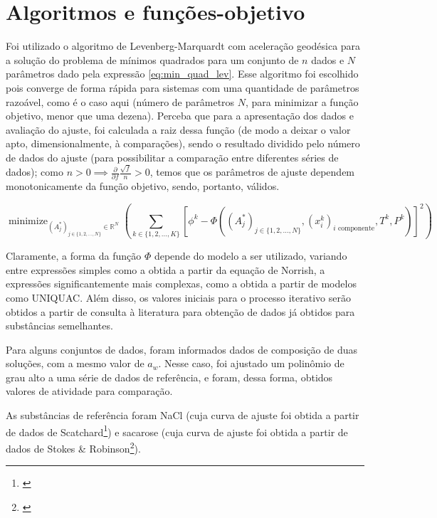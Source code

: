 \documentclass[
	12pt,				%
	openright,
	twoside,
	a4paper,			%
	english,			%
	french,				%
	brazil				%
	]{abntex2}
\DeclareMathOperator*{\minimize}{minimize}
\begin{document}
\chapter{Algoritmos e funções-objetivo}

Foi utilizado o algoritmo de Levenberg-Marquardt com aceleração geodésica para a
solução do problema de mínimos quadrados para um conjunto de $n$ dados e $N$
parâmetros dado pela expressão \ref{eq:min_quad_lev}.
Esse algoritmo foi escolhido pois converge de forma rápida para sistemas com
uma quantidade de parâmetros razoável, como é o caso aqui (número de parâmetros
$N$, para minimizar a função objetivo, menor que uma dezena).
Perceba que para a apresentação dos dados e avaliação do ajuste, foi calculada a
raiz dessa função (de modo a deixar o valor apto, dimensionalmente, à comparações),
sendo o resultado dividido pelo número de dados do ajuste (para possibilitar a
comparação entre diferentes séries de dados); como
$n>0 \implies \frac{\partial}{\partial f}\frac{\sqrt{f}}{n} >0$, temos que os
parâmetros de ajuste dependem monotonicamente da função objetivo, sendo, portanto,
válidos.

\begin{equation}
	\label{eq:min_quad_lev}
	\minimize_{(A_j^*)_{j \in \{1,2,\ldots,N\}} \in \mathbb{R}^N}%
	\left(\sum_{k \in \{1,2,\ldots,K\}}\left[\phi^k - \Phi((A^*_j)_{j%
	\in \{1, 2, \ldots, N\}}, (x^k_i)_\text{$i$ componente},%
	T^k, P^k)\right]^2\right)
\end{equation}

Claramente, a forma da função $\Phi$ depende do modelo a ser utilizado, variando
entre expressões simples como a obtida a partir da equação de Norrish, a
expressões significantemente mais complexas, como a obtida a partir de modelos
como UNIQUAC. Além disso, os valores iniciais para o processo iterativo serão
obtidos a partir de consulta à literatura para obtenção de dados já obtidos para
substâncias semelhantes.

Para alguns conjuntos de dados, foram informados dados de composição de duas
soluções, com a mesmo valor de $a_w$. Nesse caso, foi ajustado um polinômio
de grau alto a uma série de dados de referência, e foram, dessa forma, obtidos
valores de atividade para comparação.

As substâncias de referência foram NaCl (cuja curva de ajuste foi obtida a
partir de dados de Scatchard\footnote{\cite{scatchard1938}}) e sacarose (cuja
curva de ajuste foi obtida a partir de dados de Stokes \& Robinson\footnote{%
\cite{stokes1961}}).
\end{document}
